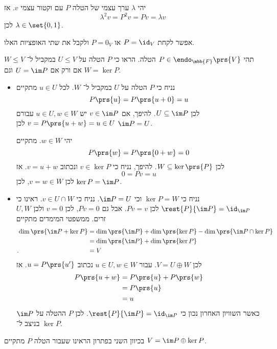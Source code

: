 \documentclass[a4paper,10pt,oneside,openany]{article}
\begin{document}
\begin{solution}
יהי
$\lambda$
ערך עצמי של הטלה
$P$
עם וקטור עצמי
$v$.
אז
\[\lambda^2 v = P^2 v = P v = \lambda v\]
לכן
$\lambda \in \set{0,1}$.

אפשר לקחת
$P = \id_V$
או
$P = 0_V$
ולקבל את שתי האופציות האלו.
\end{solution}

\begin{exercise}
תהי
$P \in \endo_{\mbb{F}}\prs{V}$
הטלה.
הראו כי
$P$
הטלה על
$U \leq V$
במקביל ל־%
$W \leq V$
אם ורק אם
$U = \im P$
וגם
$W = \ker P$.
\end{exercise}

\begin{solution}
\begin{itemize}
\item נניח כי
$P$
הטלה על
$U$
במקביל ל־%
$W$.
לכל
$u \in U$
מתקיים
\[P\prs{u} = P\prs{u+0} = u\]
לכן
$U \subseteq \im P$.
להיפך, אם
$v \in \im P$
יש
$u \in U, w \in W$
עבורם
$v = P\prs{u+w} = u \in U$
לכן
$\im P = U$.

יהי
$w \in W$.
מתקיים
\[P\prs{w} = P\prs{0+w} = 0\]
לכן
$W \subseteq \ker\prs{P}$.
להיפך, נניח כי
$v \in \ker P$
ונכתוב
$v = u + w$.
אז
\[0 = Pv = u\]
לכן
$v = w \in W$,
לכן
$\ker P = \im P$.

\item נניח כי
$\ker P = W$
וכי
$\im P = U$.
נניח כי
$v \in U \cap W$.
ראינו כי
$\rest{P}{\im P} = \id_{\im P}$
לכן
$Pv = v$.
אבל גם
$Pv = 0$,
לכן
$v = 0$
ולכן
$U,W$
זרים.
ממשפטי המימדים מתקיים
\begin{align*}
\dim \prs{\im P + \ker P} &=
\dim\prs{\im P} + \dim\prs{\ker P} - \dim\prs{\im P \cap \ker P}
\\&=
\dim\prs{\im P} + \dim\prs{\ker P}
\\ \text{.} \hphantom{\dim \prs{\im P + \ker P}} &= V
\end{align*}
לכן
$V = U \oplus W$.
עבור
$u \in U, w \in W$
נכתוב
$u = P\prs{u'}$.
אז
\begin{align*}
P\prs{u + w} &= P\prs{u} + P\prs{w}
\\&= P\prs{u}
\\&= u
\end{align*}
כאשר השוויון האחרון נכון כי
$\rest{P}{\im P} = \id_{\im P}$.
לכן
$P$
ההטלה על
$\im P$
בניצב ל־%
$\ker P$.
\end{itemize}
\end{solution}

\begin{remark}
בכיוון השני בפתרון הראינו שעבור הטלה
$P$
מתקיים
$V = \im P \oplus \ker P$.
\end{remark}
\end{document}
